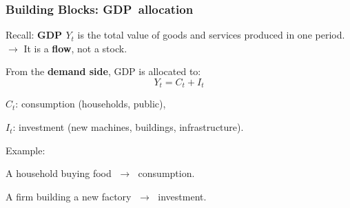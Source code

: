 \documentclass[xcolor=x11names,compress,aspectratio=169]{beamer}%
\makeatletter
\renewenvironment{itemize}{\begin{compactitemize}[<+-| alert@+>]}{\end{compactitemize}}
\makeatother
\begin{document}
\begin{frame}%
%

\frametitle{Building Blocks: GDP\ allocation}%


\begin{itemize}
\item Recall: \textbf{GDP $Y_{t}$} is the total value of goods and services
produced in one period. $\rightarrow$ It is a \textbf{flow}, not a stock.
\vspace{0.3cm}

\item From the \textbf{demand side}, GDP is allocated to:
\[
Y_{t} = C_{t} + I_{t}
\]


\begin{itemize}
\item $C_{t}$: consumption (households, public),

\item $I_{t}$: investment (new machines, buildings, infrastructure).
\end{itemize}

\vspace{0.3cm}

\item Example:

\begin{itemize}
\item A household buying food $\;\to\;$ consumption.

\item A firm building a new factory $\;\to\;$ investment.
\end{itemize}
\end{itemize}

%

\transboxout
\end{frame}%
%
\end{document}
